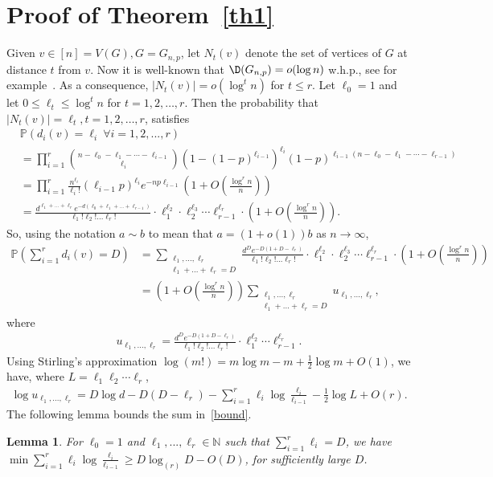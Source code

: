 \documentclass[12pt,a4paper]{article}
\def\A{\forall}
\newtheorem{lemma}[theorem]{Lemma}
\newcommand{\brac}[1]{\left(#1\right)}
\newcommand{\bfrac}[2]{\left(\frac{#1}{#2}\right)}
\def\Pr{\mathbb{P}}
\newcommand{\beq}[2]{\begin{align}\label{#1}#2\end{align}}
\def\N{\mathbb{N}}
\theoremstyle{plain}
\begin{document}
\section{Proof of Theorem~\ref{th1}}\label{Delta}
Given $v\in[n]=V(G), G=G_{n,p}$, let $N_t(v)$ denote the set of vertices of $G$ at distance $t$ from $v$. Now it is well-known that $\D(G_{n,p})=o(\log n)$ w.h.p., see for example~\cite{FrKa16}. As a consequence, $|N_t(v)|=o(\log^tn)$ for $t\leq r$. Let $\ell_0=1$ and let $0\leq \ell_t\leq \log^tn$ for $t=1,2,\ldots,r$. Then the probability that $|N_t(v)|=\ell_t,t=1,2,\ldots,r$, satisfies
\begin{align*}
&\Pr(d_i(v)=\ell_i \ \A i =1,2,...,r ) \\
&= \prod_{i=1}^r\binom{n-\ell_0-\ell_1-\cdots-\ell_{i-1}}{\ell_i}(1-(1-p)^{\ell_{i-1}})^{\ell_i} (1-p)^{\ell_{i-1}(n-\ell_0-\ell_1-\cdots-\ell_{r-1})} \\
&=\prod_{i=1}^r\frac{n^{\ell_i}}{\ell_i!}(\ell_{i-1}p)^{\ell_i}e^{-np\ell_{i-1}}\brac{1+O\bfrac{\log^rn}{n}}\\
& = \frac{d^{\ell_1+...+\ell_r} e^{-d(\ell_0+\ell_1+...+\ell_{r-1})}}{\ell_1!\ell_2!...\ell_r!} \cdot \ell_1^{\ell_2}\cdot\ell_2^{\ell_3}\cdots\ell_{r-1}^{\ell_r} \cdot \brac{1+O\bfrac{\log^rn}{n}}.
\end{align*}
So, using the notation $a\sim b$ to mean that $a=(1+o(1))b$ as $n\to\infty$,
\begin{align}
\Pr\brac{\sum_{i=1}^r d_i(v) = D}& = \sum_{\substack{\ell_1,...,\ell_r \\ \ell_1+...+\ell_r = D}} \frac{d^{D} e^{-D(1+D-\ell_r)}}{\ell_1!\ell_2!...\ell_r!} \cdot \ell_1^{\ell_2}\cdot\ell_2^{\ell_3}\cdots\ell_{r-1}^{\ell_r} \cdot \brac{1+O\bfrac{\log^rn}{n}}\nonumber\\
& = \brac{1+O\bfrac{\log^rn}{n}}\sum_{\substack{\ell_1,...,\ell_r \\ \ell_1+...+\ell_r = D}} u_{\ell_1,...,\ell_r},\label{uhu}
\end{align}
where 
\beq{ul}{
u_{\ell_1,...,\ell_r} = \frac{d^De^{-D(1+D-\ell_r)}}{\ell_1!\ell_2!...\ell_r!}\cdot \ell_1^{\ell_2}\cdots \ell_{r-1}^{\ell_r}.
}
Using Stirling's approximation $\log(m!) = m\log m - m + \frac12\log m+O(1)$, we have, where $L=\ell_1\ell_2\cdots\ell_r$,
\beq{bound}{
\log u_{\ell_1,...,\ell_r} = D\log d - D(D-\ell_r) - \sum\limits_{i=1}^r \ell_i \log\frac{\ell_i}{\ell_{i-1}} -\tfrac12\log L+O(r).
}
The following lemma bounds the sum in~\eqref{bound}. 	
\begin{lemma}\label{lem2}
	For $\ell_0=1$ and $\ell_1,...,\ell_r \in \N$ such that $\sum\limits_{i=1}^r \ell_i = D$, we have $\min \sum\limits_{i=1}^r \ell_i \log \frac{\ell_i}{\ell_{i-1}} \geq D\log_{(r)}D - O(D)$, for sufficiently large $D$.
\end{lemma}
\end{document}
